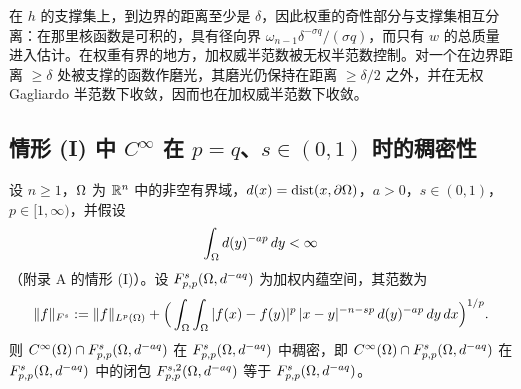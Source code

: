\begin{remark}[直觉]
在 $h$ 的支撑集上，到边界的距离至少是 $\delta$，因此权重的奇性部分与支撑集相互分离：在那里核函数是可积的，具有径向界 $\omega_{n-1}\delta^{-\sigma q}/(\sigma q)$，而只有 $w$ 的总质量进入估计。在权重有界的地方，加权威半范数被无权半范数控制。对一个在边界距离 $\ge\delta$ 处被支撑的函数作磨光，其磨光仍保持在距离 $\ge\delta/2$ 之外，并在无权 Gagliardo 半范数下收敛，因而也在加权威半范数下收敛。
\end{remark}

\subsection{情形 (I) 中 \texorpdfstring{$C^\infty$}{C-infinity} 在 \texorpdfstring{$p=q$}{p=q}、\texorpdfstring{$s\in(0,1)$}{s in (0,1)} 时的稠密性}

\begin{theorem}[情形 (I)：$p=q$、$s\in(0,1)$ 时 $C^\infty$ 的稠密性]
设 $n\ge1$，$\Omega$ 为 $\mathbb{R}^n$ 中的非空有界域，$d(x)=\operatorname{dist}(x,\partial\Omega)$，$a>0$，$s\in(0,1)$，$p\in[1,\infty)$，并假设
\[
  \int_\Omega d(y)^{-ap}\,dy<\infty
\]
（附录 A 的情形 (I)）。设 $F^s_{p,p}(\Omega,d^{-aq})$ 为加权内蕴空间，其范数为
\[
  \|f\|_{F^s}:=\|f\|_{L^p(\Omega)}
  +\Big(\int_\Omega\int_\Omega |f(x)-f(y)|^p\,|x-y|^{-n-sp}\,d(y)^{-ap}\,dy\,dx\Big)^{1/p}.
\]
则 $C^\infty(\Omega)\cap F^s_{p,p}(\Omega,d^{-aq})$ 在 $F^s_{p,p}(\Omega,d^{-aq})$ 中稠密，即 $C^\infty(\Omega)\cap F^s_{p,p}(\Omega,d^{-aq})$ 在 $F^s_{p,p}(\Omega,d^{-aq})$ 中的闭包 $F^{s,2}_{p,p}(\Omega,d^{-aq})$ 等于 $F^s_{p,p}(\Omega,d^{-aq})$。
\end{theorem}

